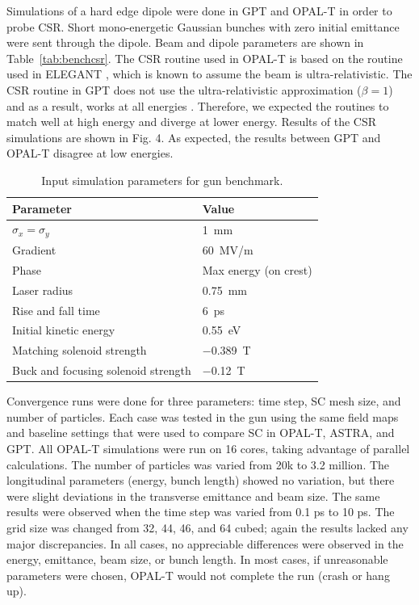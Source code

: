 Simulations  of  a  hard  edge  dipole  were  done  in  GPT  
and   OPAL-T   in   order   to   probe   CSR.   Short   
mono-energetic  Gaussian  bunches  with  zero  initial  emittance  
were sent through the dipole. Beam and dipole parameters 
are shown in Table~\ref{tab:benchcsr}. 
The CSR routine used in OPAL-T is based on 
the routine  used  in  ELEGANT  \cite{elegant}, which is known to assume  
the beam is ultra-relativistic. The CSR routine in GPT  
does  not  use  the  ultra-relativistic  approximation ($\beta=1$) 
and  as  a  result,  works  at  all energies  \cite{gptcsr}.  
Therefore, we expected  the  routines  to  match  well  at  high  energy  and  
diverge  at  lower  energy.  Results  of  the  CSR  simulations  
are  shown  in  Fig.  4.  As  expected,  the  results  between  
GPT and OPAL-T disagree at low energies. 
\begin{table}
	\begin{center}
		\begin{tabular}{l l} 
			\toprule
			\textbf{Parameter} & \textbf{Value} \\ 
			\midrule
			$\sigma_x =\sigma_y$ & \SI{1}{mm} \\
			\addlinespace[-1em] 
			Gradient & \SI{60}{MV/m} \\
			\addlinespace[-1em] 
			Phase & Max energy (on crest) \\
			\addlinespace[-1em] 
			Laser radius & \SI{0.75}{mm} \\
			\addlinespace[-1em] 
			Rise and fall time & \SI{6}{ps} \\
			\addlinespace[-1em] 
			Initial kinetic energy & \SI{0.55}{eV} \\
			\addlinespace[-1em] 
			Matching solenoid strength & \SI{-0.389}{T} \\
			\addlinespace[-1em] 
			Buck and focusing solenoid strength & \SI{-0.12}{T} \\
			\bottomrule			
		\end{tabular}
	\end{center}
	\caption{Input simulation parameters for gun benchmark.}
\end{table}\label{tab:benchcsr}


Convergence runs were done for three parameters: 
time step,  SC  mesh  size,  and  number  of  particles.  
Each  case was tested in the gun using the same field maps and 
baseline  settings  that  were  used  to  compare  SC  in  OPAL-T,  
ASTRA, and GPT. All OPAL-T simulations were run on 
16 cores, taking advantage of parallel calculations. 
The number of particles was varied from 20k to 3.2  million.  
The  longitudinal  parameters  (energy,  bunch length)  
showed  no  variation,  but  there  were  slight  deviations 
in the transverse emittance and beam size. The same results 
were observed when the time step was varied from 0.1 ps  to  10  ps.  
The  grid  size  was  changed  from  32,  44,  46, and 64 cubed; 
again the results lacked any major discrepancies.  
In all cases, no appreciable differences were observed in the energy,
emittance, beam size, or bunch length. In  most  cases,  
if unreasonable  parameters  were chosen, 
OPAL-T would not complete the run (crash or hang up).  

